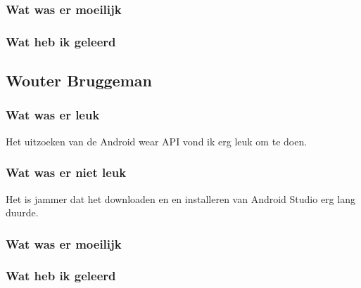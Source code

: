 \documentclass[../main.tex]{subfiles}
\begin{document}
\subsubsection{Wat was er moeilijk}
\subsubsection{Wat heb ik geleerd}
\newpage

\subsection{Wouter Bruggeman}
\subsubsection{Wat was er leuk}
Het uitzoeken van de Android wear API vond ik erg leuk om te doen.
\subsubsection{Wat was er niet leuk}
Het is jammer dat het downloaden en en installeren van Android Studio erg lang duurde.
\subsubsection{Wat was er moeilijk}
\subsubsection{Wat heb ik geleerd}
\newpage
\end{document}
